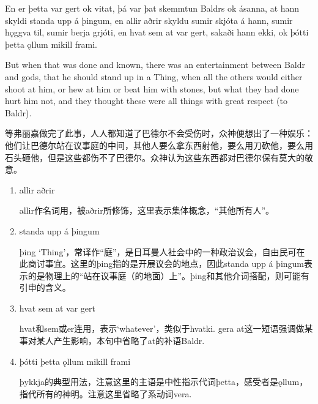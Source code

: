 \begin{paracol}{2}
  En er þetta var gert ok vitat, þá var þat skemmtun Baldrs ok ásanna, at hann skyldi standa upp á þingum, en allir aðrir skyldu sumir skjóta á hann, sumir hǫggva til, sumir berja grjóti, en hvat sem at var gert, sakaði hann ekki, ok þótti þetta ǫllum mikill frami.

  \switchcolumn

  But when that was done and known, there was an entertainment between Baldr and gods, that he should stand up in a Thing, when all the others would either shoot at him, or hew at him or beat him with stones, but what they had done hurt him not, and they thought these were all things with great respect (to Baldr).
\end{paracol}
\begin{translation*}{}
  等弗丽嘉做完了此事，人人都知道了巴德尔不会受伤时，众神便想出了一种娱乐：他们让巴德尔站在议事庭的中间，其他人要么拿东西射他，要么用刀砍他，要么用石头砸他，但是这些都伤不了巴德尔。众神认为这些东西都对巴德尔保有莫大的敬意。
\end{translation*}
\begin{grammar*}{}
  \begin{enumerate}[leftmargin=*]
    \item allir aðrir

          allir作名词用，被aðrir所修饰，这里表示集体概念，“其他所有人”。
    \item standa upp á þingum

          þing `Thing'，常译作“庭”，是日耳曼人社会中的一种政治议会，自由民可在此商讨事宜。这里的þing指的是开展议会的地点，因此standa upp á þingum表示的是物理上的“站在议事庭（的地面）上”。þing和其他介词搭配，则可能有引申的含义。

    \item hvat sem at var gert

          hvat和sem或er连用，表示`whatever'，类似于hvatki. gera at这一短语强调做某事对某人产生影响，本句中省略了at的补语Baldr.

    \item þótti þetta ǫllum mikill frami

          þykkja的典型用法，注意这里的主语是中性指示代词þetta，感受者是ǫllum，指代所有的神明。注意这里省略了系动词vera.
  \end{enumerate}
\end{grammar*}

